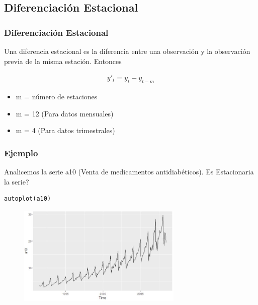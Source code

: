 \documentclass[10pt]{beamer}
\begin{document}



\subsection{Diferenciación Estacional}

\begin{frame}[fragile]
\frametitle{Diferenciación Estacional}


Una diferencia estacional es la diferencia entre una observación y la observación previa de la misma estación. Entonces

\begin{eqnarray}
y'_t = y_t - y_{t-m}
\end{eqnarray}

\vspace{4mm}


\begin{itemize}
\item m = número de estaciones
\item m = 12 (Para datos mensuales)
\item m = 4 (Para datos trimestrales)
\end{itemize}



\end{frame}






\begin{frame}[fragile]
\frametitle{Ejemplo}


Analicemos la serie a10 (Venta de medicamentos antidiabéticos). Es Estacionaria la serie?



\lstset{language=r,label= ,caption= ,captionpos=b,numbers=none}
\begin{lstlisting}
autoplot(a10)
\end{lstlisting}

\pause


\begin{figure}
\begin{center}
    \includegraphics[width=0.7\textwidth]{Imagen6.JPG}
\end{center}
\end{figure}



\end{frame}
\end{document}
